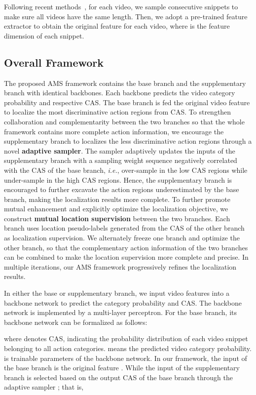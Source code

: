 \documentclass[journal]{IEEEtran}
\begin{document}
Following recent methods~\cite{paul2018w,liu2019completeness,lee2019background,shi2020weakly}, for each video, we sample  consecutive snippets to make sure all videos have the same length. Then, we adopt a pre-trained feature extractor to obtain the original feature  for each video, where  is the feature dimension of each snippet.




\subsection{Overall Framework}
The proposed AMS framework contains the base branch and the supplementary branch with identical backbones. Each backbone predicts the video category probability and respective CAS. The base branch is fed the original video feature to localize the most discriminative action regions from CAS. To strengthen collaboration and complementarity between the two branches so that the whole framework contains more complete action information, we encourage the supplementary branch to localizes the less discriminative action regions through a novel \textbf{adaptive sampler}. The sampler adaptively updates the inputs of the supplementary branch with a sampling weight sequence negatively correlated with the CAS of the base branch, \emph{i.e.}, over-sample in the low CAS regions while under-sample in the high CAS regions. Hence, the supplementary branch is encouraged to further excavate the action regions underestimated by the base branch, making the localization results more complete. To further promote mutual enhancement and explicitly optimize the localization objective, we construct \textbf{mutual location supervision} between the two branches. Each branch uses location pseudo-labels generated from the CAS of the other branch as localization supervision. We alternately freeze one branch and optimize the other branch, so that the complementary action information of the two branches can be combined to make the location supervision more complete and precise. In multiple iterations, our AMS framework progressively refines the localization results.




In either the base or supplementary branch, we input video features into a backbone network  to predict the category probability and CAS. The backbone network is implemented by a multi-layer perceptron. For the base branch, its backbone network can be formalized as follows:

where  denotes CAS, indicating the probability distribution of each video snippet belonging to all action categories.  means the predicted video category probability.  is trainable parameters of the backbone network. In our framework, the input of the base branch is the original feature . While the input of the supplementary branch is selected based on the output CAS of the base branch through the adaptive sampler ; that is,
\end{document}
